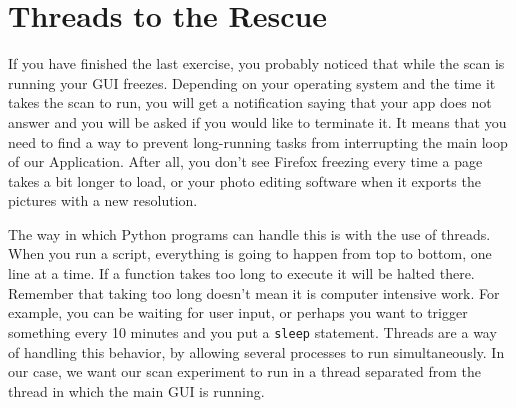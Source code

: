 


\section{Threads to the Rescue}\label{threads-to-therescue}
If you have finished the last exercise, you probably noticed that while
the scan is running your {GUI} freezes. Depending on your operating
system and the time it takes the scan to run, you will get a
notification saying that your app does not answer and you will be asked
if you would like to terminate it. It means that you need to find a way
to prevent long-running tasks from interrupting the main loop of our
Application. After all, you don't see Firefox freezing every time a page
takes a bit longer to load, or your photo editing software when it
exports the pictures with a new resolution.

The way in which Python programs can handle this is with the use of
threads. When you run a script, everything is going to happen from top
to bottom, one line at a time. If a function takes too long to execute
it will be halted there. Remember that taking too long doesn't mean it
is computer intensive work. For example, you can be waiting for user
input, or perhaps you want to trigger something every 10 minutes and you
put a \texttt{sleep} statement. Threads are a way of handling this
behavior, by allowing several processes to run simultaneously. In our
case, we want our scan experiment to run in a thread separated from the
thread in which the main {GUI} is running.


